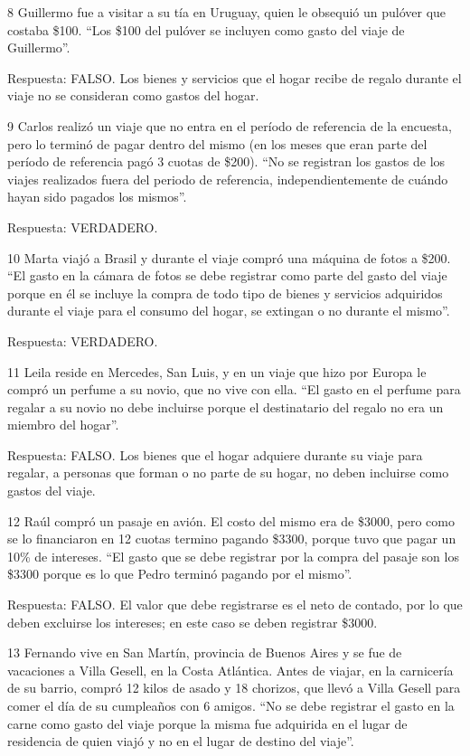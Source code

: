 \documentclass[
  openany]{book}
\begin{document}
8 Guillermo fue a visitar a su tía en Uruguay, quien le obsequió un pulóver que costaba \$100.
``Los \$100 del pulóver se incluyen como gasto del viaje de Guillermo''.

Respuesta: FALSO. Los bienes y servicios que el hogar recibe de regalo durante el viaje no se consideran como gastos del hogar.

9 Carlos realizó un viaje que no entra en el período de referencia de la encuesta, pero lo terminó de pagar dentro del mismo (en los meses que eran parte del período de referencia pagó 3 cuotas de \$200).
``No se registran los gastos de los viajes realizados fuera del periodo de referencia, independientemente de cuándo hayan sido pagados los mismos''.

Respuesta: VERDADERO.

10 Marta viajó a Brasil y durante el viaje compró una máquina de fotos a \$200.
``El gasto en la cámara de fotos se debe registrar como parte del gasto del viaje porque en él se incluye la compra de todo tipo de bienes y servicios adquiridos durante el viaje para el consumo del hogar, se extingan o no durante el mismo''.

Respuesta: VERDADERO.

11 Leila reside en Mercedes, San Luis, y en un viaje que hizo por Europa le compró un perfume a su novio, que no vive con ella.
``El gasto en el perfume para regalar a su novio no debe incluirse porque el destinatario del regalo no era un miembro del hogar''.

Respuesta: FALSO. Los bienes que el hogar adquiere durante su viaje para regalar, a personas que forman o no parte de su hogar, no deben incluirse como gastos del viaje.

12 Raúl compró un pasaje en avión. El costo del mismo era de \$3000, pero como se lo financiaron en 12 cuotas termino pagando \$3300, porque tuvo que pagar un 10\% de intereses.
``El gasto que se debe registrar por la compra del pasaje son los \$3300 porque es lo que Pedro terminó pagando por el mismo''.

Respuesta: FALSO. El valor que debe registrarse es el neto de contado, por lo que deben excluirse los intereses; en este caso se deben registrar \$3000.

13 Fernando vive en San Martín, provincia de Buenos Aires y se fue de vacaciones a Villa Gesell, en la Costa Atlántica. Antes de viajar, en la carnicería de su barrio, compró 12 kilos de asado y 18 chorizos, que llevó a Villa Gesell para comer el día de su cumpleaños con 6 amigos.
``No se debe registrar el gasto en la carne como gasto del viaje porque la misma fue adquirida en el lugar de residencia de quien viajó y no en el lugar de destino del viaje''.
\end{document}
